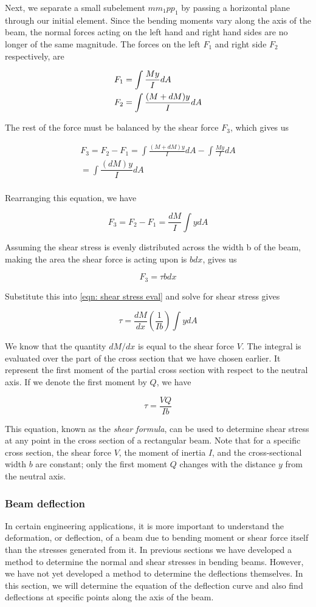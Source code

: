 \documentclass[a4paper,openany,nobib]{tufte-book}
\begin{document}
Next, we separate a small subelement \(mm_1pp_1\) by passing a horizontal
plane through our initial element. Since the bending moments vary along
the axis of the beam, the normal forces acting on the left hand and
right hand sides are no longer of the same magnitude. The forces on the
left \(F_1\) and right side \(F_2\) respectively, are

$$\begin{gathered}
    F_1 = \int \frac{My}{I}dA \hfill \\
    F_2 = \int \frac{(M + dM)y}{I}dA \hfill\end{gathered}$$

The rest of the force must be balanced by the shear force \(F_3\), which
gives us

$$\begin{gathered}
  F_3 = F_2 - F_1 = \int \frac{(M + dM)y}{I}dA  - \int \frac{My}{I}dA  \\ 
   = \int \dfrac{(dM)y}{I}dA \\ 
 \end{gathered}$$

Rearranging this equation, we have

$$ F_3 = F_2 - F_1 = \frac{dM}{I}\int y dA$$

Assuming the shear stress is evenly distributed across the width b of
the beam, making the area the shear force is acting upon is \(bdx\), gives
us

$$F_3 = \tau bdx$$

Substitute this into \ref{eqn: shear stress eval} and solve for
shear stress gives

$$\tau  = \frac{dM}{dx}\left( \frac{1}{Ib} \right) \int ydA$$

We know that the quantity \(dM/dx\) is equal to the shear force \(V\). The
integral is evaluated over the part of the cross section that we have
chosen earlier. It represent the first moment of the partial cross
section with respect to the neutral axis. If we denote the first moment
by \(Q\), we have

$$\tau  = \frac{VQ}{Ib}$$

This equation, known as the \emph{shear formula}, can be used to determine
shear stress at any point in the cross section of a rectangular beam.
Note that for a specific cross section, the shear force \(V\), the moment
of inertia \(I\), and the cross-sectional width \(b\) are constant; only the
first moment \(Q\) changes with the distance \(y\) from the neutral axis.

\subsubsection{Beam deflection}
\label{subsection: beam deflection}
In certain engineering applications, it is more important to understand
the deformation, or deflection, of a beam due to bending moment or shear
force itself than the stresses generated from it. In previous sections
we have developed a method to determine the normal and shear stresses in
bending beams. However, we have not yet developed a method to determine
the deflections themselves. In this section, we will determine the
equation of the deflection curve and also find deflections at specific
points along the axis of the beam.
\end{document}
